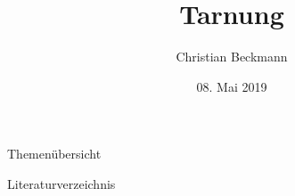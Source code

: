 \documentclass[aspectratio=169, 9pt, bibliography=totoc]{beamer}
\title{Tarnung}
\author[C.~Beckmann]{Christian Beckmann}
\institute[Seminar Moderne Optik]{Seminar Moderne Optik}
\date{08. Mai 2019}
\begin{document}
\maketitle

\begin{frame}{Themen\"ubersicht}
  \tableofcontents
\end{frame}



\begin{frame}{Literaturverzeichnis}
	\printbibliography
\end{frame}
\end{document}
